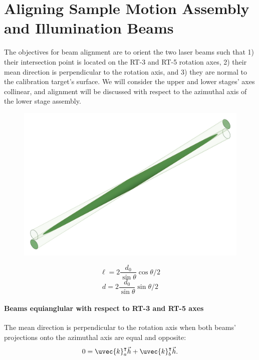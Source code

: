 \section{Aligning Sample Motion Assembly and Illumination Beams}
The objectives for beam alignment are to orient the two laser beams such that 1) their intersection point is located on the RT-3 and RT-5 rotation axes, 2) their mean direction is perpendicular to the rotation axis, and 3) they are normal to the calibration target's surface. We will consider the upper and lower stages' axes collinear, and alignment will be discussed with respect to the azimuthal axis of the lower stage assembly.
\begin{figure}
    \centering
    \includegraphics[width=0.5\linewidth]{figures/beam_intersection_nooutline.png}
    \caption{}
    \label{fig:beam_intersection}
\end{figure}
%
\begin{equation}
    \ell = 2 \frac{d_0}{\sin{\theta}} \cos{\theta/2}
\end{equation}
%
\begin{equation}
    d = 2 \frac{d_0}{\sin{\theta}} \sin{\theta/2}
\end{equation}


\paragraph{Beams equianglular with respect to RT-3 and RT-5 axes}
The mean direction is perpendicular to the rotation axis when both beams' projections onto the azimuthal axis are equal and opposite:
\begin{equation}
    0 = \uvec{k}_a^\intercal \vec{h} + \uvec{k}_b^\intercal \vec{h}.
    \label{eqn:beam_equiangular_objective}
\end{equation}


